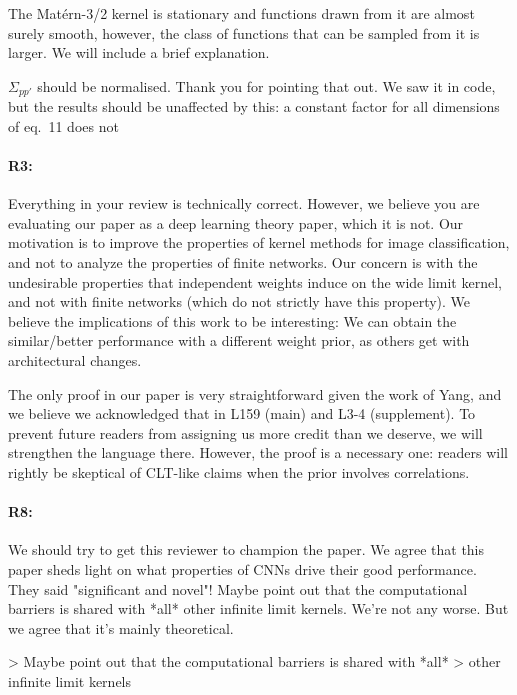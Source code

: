 \documentclass{article}
\newcommand{\adriacomment}[1]{\todo[color=blue]{#1}}
\begin{document}
The Matérn-3/2 kernel is stationary and functions drawn from it are almost surely smooth, however, the class of functions that can be sampled from it is larger. \adriacomment{What do we say here?} We will include a brief explanation.

$\Sigma_{{pp'}}$ should be normalised. Thank you for pointing that out. We saw it in code, but the results should be unaffected by this: a constant factor for all dimensions of eq.~11 does not

\paragraph{R3:}
Everything in your review is technically correct. However, we believe you are
evaluating our paper as a deep learning theory paper, which it is not. Our
motivation is to improve the properties of kernel methods for image
classification, and not to analyze the properties of finite networks. Our concern is with the undesirable properties that independent weights induce on the wide limit kernel, and not with finite networks (which do not strictly have this property).
We believe the implications of this work to be interesting: We can obtain the similar/better performance with a different weight prior, as others get with architectural changes.

The only proof in our paper is very straightforward given the work of Yang, and
we believe we acknowledged that in L159 (main) and L3-4 (supplement). To prevent
future readers from assigning us more credit than we deserve, we will strengthen
the language there. However, the proof is a necessary one: readers will rightly be
skeptical of CLT-like claims when the prior involves correlations.


\paragraph{R8:}
We should try to get this reviewer to champion the paper.
We agree that this paper sheds light on what properties of CNNs drive their good performance. They said "significant and novel"!
Maybe point out that the computational barriers is shared with *all* other infinite limit kernels. We're not any worse. But we agree that it's mainly theoretical.

> Maybe point out that the computational barriers is shared with *all*
> other infinite limit kernels
\end{document}
